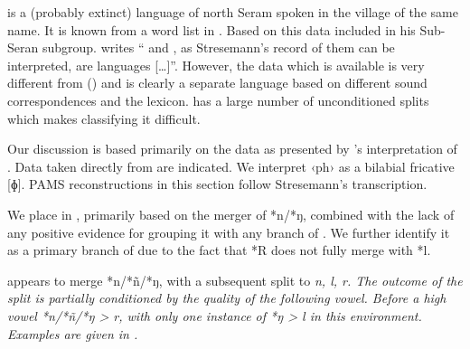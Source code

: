  is a (probably extinct) language of north Seram spoken
in the village of the same name.
It is known from a word list in \citet{Ludeking1868}.
Based on this data \citet{Stresemann1927} included  in his Sub-Seran subgroup.
\citet[117]{Collins1982c} writes “
and , as Stresemann’s record of them can be interpreted,
are  languages [{\ldots}]”.
However, the data which is available is very different from 
() and  is clearly a separate language based on different sound
correspondences and the lexicon.
 has a large number of unconditioned splits which makes classifying it difficult.

Our discussion is based primarily on the data as presented by
\citeauthor{Stresemann1927}’s \citeyear{Stresemann1927} interpretation of \citet{Ludeking1868}.
Data taken directly from \citet{Ludeking1868} are indicated.
We interpret ‹ph› as a bilabial fricative [ɸ].
PAMS reconstructions in this section follow Stresemann’s transcription.

We place  in ,
primarily based on the merger of *n/*ŋ,
combined with the lack of any positive evidence for grouping
it with any branch of .
We further identify it as a primary branch of 
due to the fact that *R does not fully merge with *l.

 appears to merge *n/*ñ/*ŋ,
with a subsequent split to \it{n, l, r}.
The outcome of the split is partially conditioned by the quality
of the following vowel.
Before a high vowel *n/*ñ/*ŋ > \it{r},
with only one instance of *ŋ > \it{l} in this environment.
Examples are given in .


